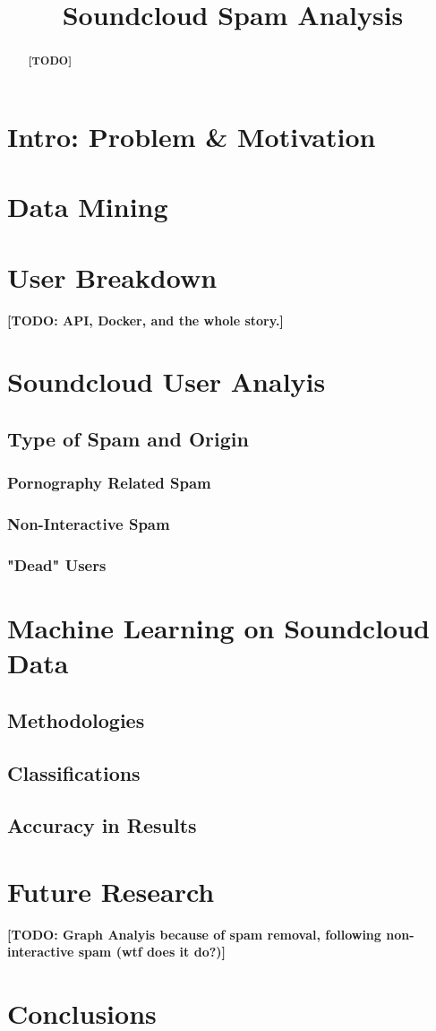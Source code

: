 \documentclass[11pt,onecolumn]{article} %
\title{Soundcloud Spam Analysis}
\author{}
\begin{document}
\maketitle

\begin{abstract}
\textbf{[TODO]}
\end{abstract}

\section{Intro: Problem \& Motivation}

\section{Data Mining}

\section{User Breakdown}
\textbf{[TODO: API, Docker, and the whole story.]}

\section{Soundcloud User Analyis}
\subsection{Type of Spam and Origin}
\subsubsection{Pornography Related Spam}
\subsubsection{Non-Interactive Spam}
\subsubsection{"Dead" Users}

\section{Machine Learning on Soundcloud Data}
\subsection{Methodologies}
\subsection{Classifications}
\subsection{Accuracy in Results}

\section{Future Research}
\textbf{[TODO: Graph Analyis because of spam removal, following non-interactive spam (wtf does it do?)]}

\section{Conclusions}
\end{document}

